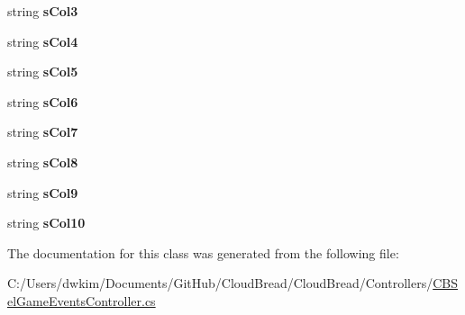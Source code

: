\begin{DoxyCompactItemize}
\item 
string {\bfseries s\+Col3}\hypertarget{a00166_a5836ad362012cab07fcb922689c62a8b}{}\label{a00166_a5836ad362012cab07fcb922689c62a8b}

\item 
string {\bfseries s\+Col4}\hypertarget{a00166_a7b3edce66bf31f1b196c55fc1753078c}{}\label{a00166_a7b3edce66bf31f1b196c55fc1753078c}

\item 
string {\bfseries s\+Col5}\hypertarget{a00166_a3cd0dc105fffaf9fa38fd31d9547082c}{}\label{a00166_a3cd0dc105fffaf9fa38fd31d9547082c}

\item 
string {\bfseries s\+Col6}\hypertarget{a00166_a8728c52203403407e36068449e5e83cc}{}\label{a00166_a8728c52203403407e36068449e5e83cc}

\item 
string {\bfseries s\+Col7}\hypertarget{a00166_a42c689114fbd32f4f4992ca90e1b3387}{}\label{a00166_a42c689114fbd32f4f4992ca90e1b3387}

\item 
string {\bfseries s\+Col8}\hypertarget{a00166_a58538e80fb9e9328f366385ef36fb720}{}\label{a00166_a58538e80fb9e9328f366385ef36fb720}

\item 
string {\bfseries s\+Col9}\hypertarget{a00166_a26253e55415fe9d1afcecf628a9bc65e}{}\label{a00166_a26253e55415fe9d1afcecf628a9bc65e}

\item 
string {\bfseries s\+Col10}\hypertarget{a00166_a73395848a04354b492d06df052c9f68e}{}\label{a00166_a73395848a04354b492d06df052c9f68e}

\end{DoxyCompactItemize}


The documentation for this class was generated from the following file\+:\begin{DoxyCompactItemize}
\item 
C\+:/\+Users/dwkim/\+Documents/\+Git\+Hub/\+Cloud\+Bread/\+Cloud\+Bread/\+Controllers/\hyperlink{a00217}{C\+B\+Sel\+Game\+Events\+Controller.\+cs}\end{DoxyCompactItemize}
